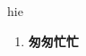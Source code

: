 
\begin{frame}
{\huge hie}
\begin{center}
\begin{enumerate}\Large
  \item \textbf{匆匆忙忙}
\end{enumerate}
\end{center}
\end{frame}
